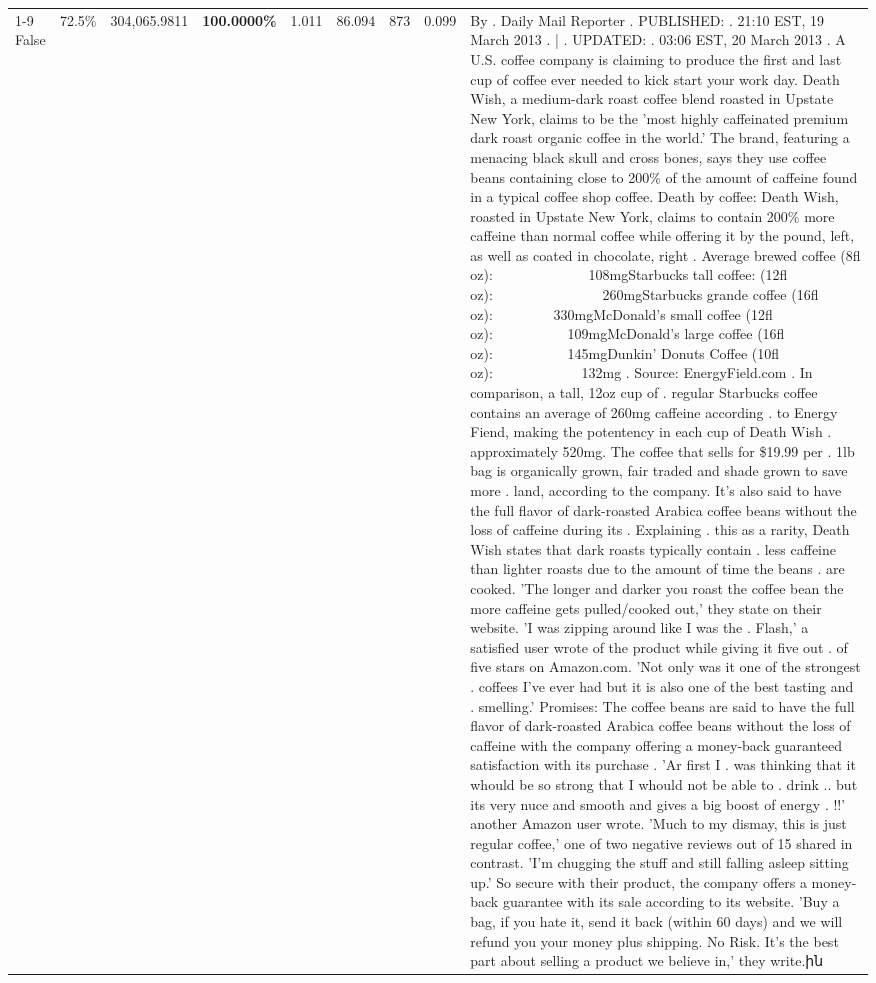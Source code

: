 \begin{table}[H]
{\begin{tabular}{lllrlllll}
\cline{1-9} \cline{2-9}
False & 72.5\% & 304,065.9811 & \bfseries \color{red} 100.0000\% & 1.011 & 86.094 & 873 & 0.099 & By . Daily Mail Reporter . PUBLISHED: . 21:10 EST, 19 March 2013 . | . UPDATED: . 03:06 EST, 20 March 2013 . A U.S. coffee company is claiming to produce the first and last cup of coffee ever needed to kick start your work day. Death Wish, a medium-dark roast coffee blend roasted in Upstate New York, claims to be the 'most highly caffeinated premium dark roast organic coffee in the world.' The brand, featuring a menacing black skull and cross bones, says they use coffee beans containing close to 200\% of the amount of caffeine found in a typical coffee shop coffee. Death by coffee: Death Wish, roasted in Upstate New York, claims to contain 200\% more caffeine than normal coffee while offering it by the pound, left, as well as coated in chocolate, right . Average brewed coffee (8fl oz):              108mgStarbucks tall coffee: (12fl oz):                260mgStarbucks grande coffee (16fl oz):         330mgMcDonald's small coffee (12fl oz):           109mgMcDonald's large coffee (16fl oz):           145mgDunkin' Donuts Coffee (10fl oz):             132mg . Source: EnergyField.com . In comparison, a tall, 12oz cup of . regular Starbucks coffee contains an average of 260mg caffeine according . to Energy Fiend, making the potentency in each cup of Death Wish . approximately 520mg. The coffee that sells for \$19.99 per . 1lb bag is organically grown, fair traded and shade grown to save more . land, according to the company. It's also said to have the full flavor of dark-roasted Arabica coffee beans without the loss of caffeine during its . Explaining . this as a rarity, Death Wish states that dark roasts typically contain . less caffeine than lighter roasts due to the amount of time the beans . are cooked. 'The longer and darker you roast the coffee bean the more caffeine gets pulled/cooked out,' they state on their website. 'I was zipping around like I was the . Flash,' a satisfied user wrote of the product while giving it five out . of five stars on Amazon.com. 'Not only was it one of the strongest . coffees I've ever had but it is also one of the best tasting and . smelling.’ Promises: The coffee beans are said to have the full flavor of dark-roasted Arabica coffee beans without the loss of caffeine with the company offering a money-back guaranteed satisfaction with its purchase . 'Ar first I . was thinking that it whould be so strong that I whould not be able to . drink .. but its very nuce and smooth and gives a big boost of energy . !!' another Amazon user wrote. 'Much to my dismay, this is just regular coffee,' one of two negative reviews out of 15 shared in contrast. 'I'm chugging the stuff and still falling asleep sitting up.' So secure with their product, the company offers a money-back guarantee with its sale according to its website. 'Buy a bag, if you hate it, send it back (within 60 days) and we will refund you your money plus shipping. No Risk. It’s the best part about selling a product we believe in,' they write.ին \\

\end{tabular}}
\end{table}
